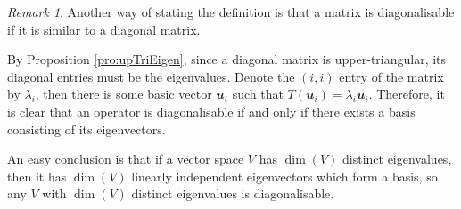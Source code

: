 \documentclass[math, code]{amznotes}
\theoremstyle{remark}
\newtheorem*{remark}{Remark}
\begin{document}
\begin{notebox}
    \begin{remark}
        Another way of stating the definition is that a matrix is diagonalisable if it is similar to a diagonal matrix.
    \end{remark}
\end{notebox}
By Proposition \ref{pro:upTriEigen}, since a diagonal matrix is upper-triangular, its diagonal entries must be the eigenvalues. Denote the $(i, i)$ entry of the matrix by $\lambda_i$, then there is some basic vector $\mathbfit{u}_i$ such that $T(\mathbfit{u}_i) = \lambda_i\mathbfit{u}_i$. Therefore, it is clear that an operator is diagonalisable if and only if there exists a basis consisting of its eigenvectors.

An easy conclusion is that if a vector space $V$ has $\dim(V)$ distinct eigenvalues, then it has $\dim(V)$ linearly independent eigenvectors which form a basis, so any $V$ with $\dim(V)$ distinct eigenvalues is diagonalisable.
\end{document}
